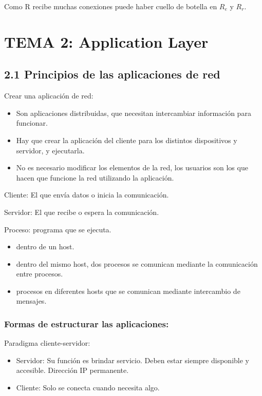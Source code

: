 \documentclass[12pt, twoside, openright]{report} %
\begin{document}
    Como R recibe muchas conexiones puede haber cuello de botella en
    \(R_e\) y \(R_r\).

\chapter{TEMA 2: Application Layer}

\section{2.1 Principios de las aplicaciones de red}

    Crear una aplicación de red:

    \begin{itemize}
    \item
      Son aplicaciones distribuidas, que necesitan intercambiar
      información para funcionar.
    \item
      Hay que crear la aplicación del cliente para los distintos
      dispositivos y servidor, y ejecutarla.
    \item
      No es necesario modificar los elementos de la red, los usuarios
      son los que hacen que funcione la red utilizando la aplicación.
    \end{itemize}

	Cliente: El que envía datos o inicia la comunicación.

	Servidor: El que recibe o espera la comunicación.

	Proceso: programa que se ejecuta.

    \begin{itemize}
    \item
      dentro de un host.
    \item
      dentro del mismo host, dos procesos se comunican mediante la
      comunicación entre procesos.
    \item
      procesos en diferentes hosts que se comunican mediante intercambio
      de mensajes.
    \end{itemize}

	
\subsection{Formas de estructurar las aplicaciones:}

    Paradigma cliente-servidor:

    \begin{itemize}
    \item
      Servidor: Su función es brindar servicio. Deben estar siempre
      disponible y accesible. Dirección IP permanente.
    \item
      Cliente: Solo se conecta cuando necesita algo.
    \end{itemize}
\end{document}

